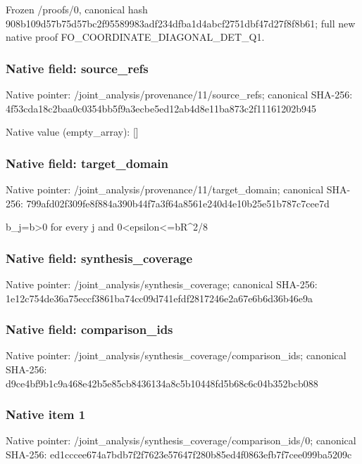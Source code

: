 \documentclass[10pt,a4paper]{article}
\begin{document}
\begingroup\raggedright\sloppy Frozen /\allowbreak{}proofs/\allowbreak{}0,\allowbreak{} canonical hash 908b109d57b75d57bc2f95589983adf234dfba1d4abcf2751dbf47d27f8f8b61;\allowbreak{} full new native proof FO\_\allowbreak{}COORDINATE\_\allowbreak{}DIAGONAL\_\allowbreak{}DET\_\allowbreak{}Q1.\par\endgroup

\subsubsection{Native field: source\_\allowbreak{}refs}
Native pointer: /joint\_\allowbreak{}analysis/provenance/11/source\_\allowbreak{}refs; canonical SHA-256: 4f53cda18c2baa0c0354bb5f9a3ecbe5ed12ab4d8e11ba873c2f11161202b945

Native value (empty\_\allowbreak{}array): []

\subsubsection{Native field: target\_\allowbreak{}domain}
Native pointer: /joint\_\allowbreak{}analysis/provenance/11/target\_\allowbreak{}domain; canonical SHA-256: 799afd02f309fe8f884a390b44f7a3f64a8561e240d4e10b25e51b787c7cee7d

\begingroup\raggedright\sloppy b\_\allowbreak{}j=\allowbreak{}b>0 for every j and 0<epsilon<=\allowbreak{}bR\textasciicircum{}2/\allowbreak{}8\par\endgroup

\subsubsection{Native field: synthesis\_\allowbreak{}coverage}
Native pointer: /joint\_\allowbreak{}analysis/synthesis\_\allowbreak{}coverage; canonical SHA-256: 1e12c754de36a75eccf3861ba74cc09d741efdf2817246e2a67e6b6d36b46e9a

\subsubsection{Native field: comparison\_\allowbreak{}ids}
Native pointer: /joint\_\allowbreak{}analysis/synthesis\_\allowbreak{}coverage/comparison\_\allowbreak{}ids; canonical SHA-256: d9ce4bf9b1c9a468e42b5e85cb8436134a8c5b10448fd5b68c6c04b352bcb088

\subsubsection{Native item 1}
Native pointer: /joint\_\allowbreak{}analysis/synthesis\_\allowbreak{}coverage/comparison\_\allowbreak{}ids/0; canonical SHA-256: ed1cccee674a7bdb7f2f7623e57647f280b85ed4f0863efb7f7cee099ba5209c
\end{document}

